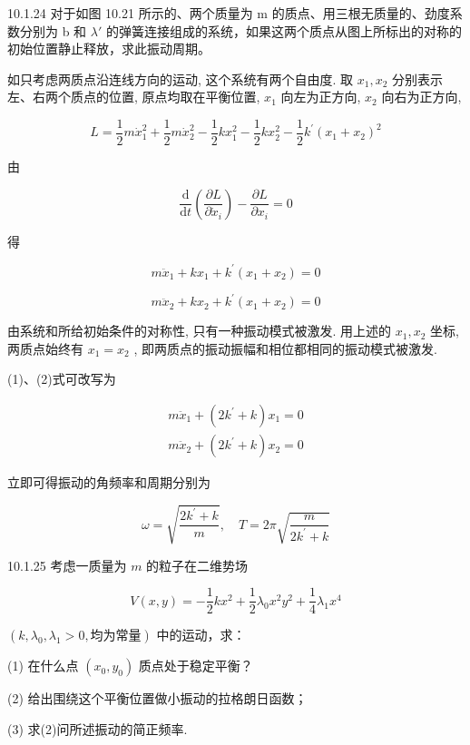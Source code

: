 \begin{problem}{10.1.24}
对于如图 10.21 所示的、两个质量为 m 的质点、用三根无质量的、劲度系数分别为 b 和 $\lambda'$ 的弹簧连接组成的系统，如果这两个质点从图上所标出的对称的初始位置静止释放，求此振动周期。

如只考虑两质点沿连线方向的运动, 这个系统有两个自由度. 取 $x_{1}, x_{2}$ 分别表示左、右两个质点的位置, 原点均取在平衡位置, $x_{1}$ 向左为正方向, $x_{2}$ 向右为正方向,

\[
L = \frac {1}{2} m \dot {x} _ {1} ^ {2} + \frac {1}{2} m \dot {x} _ {2} ^ {2} - \frac {1}{2} k x _ {1} ^ {2} - \frac {1}{2} k x _ {2} ^ {2} - \frac {1}{2} k ^ {\prime} (x _ {1} + x _ {2}) ^ {2}
\]

由

\[
\frac {\mathrm{d}}{\mathrm{d} t} \left(\frac {\partial L}{\partial \dot {x} _ {i}}\right) - \frac {\partial L}{\partial x _ {i}} = 0
\]

得

\[
m \ddot {x} _ {1} + k x _ {1} + k ^ {\prime} (x _ {1} + x _ {2}) = 0\tag{1}
\]

\[
m \ddot {x} _ {2} + k x _ {2} + k ^ {\prime} (x _ {1} + x _ {2}) = 0\tag{2}
\]

由系统和所给初始条件的对称性, 只有一种振动模式被激发. 用上述的 $x_{1}, x_{2}$ 坐标, 两质点始终有 $x_{1} = x_{2}$ , 即两质点的振动振幅和相位都相同的振动模式被激发.

(1)、(2)式可改写为

\[
\begin{array}{l} m \ddot {x} _ {1} + (2 k ^ {\prime} + k) x _ {1} = 0 \\ m \ddot {x} _ {2} + (2 k ^ {\prime} + k) x _ {2} = 0 \end{array}
\]

立即可得振动的角频率和周期分别为

\[
\omega = \sqrt {\frac {2 k ^ {\prime} + k}{m}}, \quad T = 2 \pi \sqrt {\frac {m}{2 k ^ {\prime} + k}}
\]
\begin{center}

\end{center}
\end{problem}
\clearpage


\begin{problem}{10.1.25}
考虑一质量为 $m$ 的粒子在二维势场

\[
V (x, y) = - \frac {1}{2} k x ^ {2} + \frac {1}{2} \lambda_ {0} x ^ {2} y ^ {2} + \frac {1}{4} \lambda_ {1} x ^ {4}
\]

$(k, \lambda_{0}, \lambda_{1} > 0, \text{均为常量})$ 中的运动，求：

(1) 在什么点 $(x_0, y_0)$ 质点处于稳定平衡？

(2) 给出围绕这个平衡位置做小振动的拉格朗日函数；

(3) 求(2)问所述振动的简正频率.
\end{problem}
\clearpage


